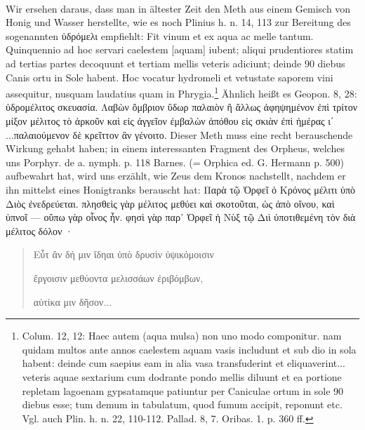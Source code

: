 \documentclass[a4paper, 11pt, oneside]{article}
\begin{document}
\paragraph{}
Wir ersehen daraus, dass man in ältester Zeit den Meth aus einem Gemisch von Honig und Wasser herstellte, wie es noch Plinius h. n. 14, 113 zur Bereitung des sogenannten ὑδρόμελι empfiehlt: Fit vinum et ex aqua ac melle tantum. Quinquennio ad hoc servari caelestem [aquam] iubent; aliqui prudentiores statim ad tertias partes decoquunt et tertiam mellis veteris adiciunt; deinde 90 diebus Canis ortu in Sole habent. Hoc vocatur hydromeli et vetustate saporem vini assequitur, nusquam laudatius quam in Phrygia.\footnote{Colum. 12, 12: Haec autem (aqua mulsa) non uno modo componitur. nam quidam multos ante annos caelestem aquam vasis includunt et sub dio in sola habent: deinde cum saepius eam in alia vasa transfuderint et eliquaverint... veteris aquae sextarium cum dodrante pondo mellis diluunt et ea portione repletam lagoenam gypsatamque patiuntur per Caniculae ortum in sole 90 diebus esse; tum demum in tabulatum, quod fumum accipit, reponunt etc. Vgl. auch Plin. h. n. 22, 110-112. Pallad. 8, 7. Oribas. 1. p. 360 ff.} Ähnlich heißt es Geopon. 8, 28: ὑδρομέλιτος σκευασία. Λαβὼν ὄμβριον ὕδωρ παλαιὸν ἢ ἄλλως ἀφηψημένον ἐπὶ τρίτον μίξον μέλιτος τὸ ἀρκοῦν καὶ εἰς ἀγγεῖον ἐμβαλὼν ἀπόθου εἰς σκιὰν ἐπὶ ἡμέρας ι΄ ...παλαιούμενον δὲ κρεῖττον ἂν γένοιτο. Dieser Meth muss eine recht berauschende Wirkung gehabt haben; in einem interessanten Fragment des Orpheus, welches uns Porphyr. de a. nymph. p. 118 Barnes. (= Orphica ed. G. Hermann p. 500) aufbewahrt hat, wird uns erzählt, wie Zeus dem Kronos nachstellt, nachdem er ihn mittelst eines Honigtranks berauscht hat: Παρὰ τῷ Ὀρφεῖ ὁ Κρόνος μέλιτι ὑπὸ Διὸς ἐνεδρεύεται. πλησθεὶς γὰρ μέλιτος μεθύει καὶ σκοτοῦται, ὡς ἀπὸ οἴνου, καὶ ὑπνοῖ --- οὕπω γὰρ οἷνος ἦν. φησὶ γὰρ παρ᾽ Ὀρφεῖ ἡ Νὺξ τῷ Διὶ ὑποτιθεμένη τὸν διὰ μέλιτος δόλον ·
\begin{quotation}
Εὖτ ἂν δή μιν ἴδηαι ὑπὸ δρυσὶν ὑψικόμοισιν

ἔργοισιν μεθύοντα μελισσάων ἐριβόμβων,

αὐτίκα μιν δῆσον...
\end{quotation}
\end{document}
